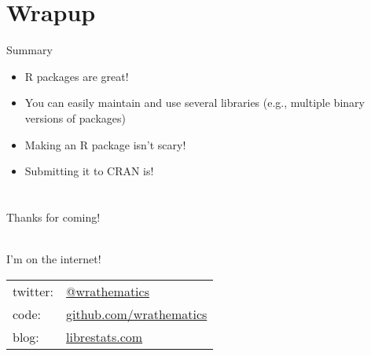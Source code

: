 \section{Wrapup}
\makesubcontentsslides
\hidenum

\begin{frame}
  \begin{block}{Summary}
    \begin{itemize}
      \item R packages are great!
      \item You can easily maintain and use several libraries (e.g., multiple 
binary versions of packages)
      \item Making an R package isn't scary!
      \item Submitting it to CRAN is!
    \end{itemize}
  \end{block}
\end{frame}



\section*{}



\begin{frame}[noframenumbering]
 \begin{block}{Thanks for coming!}
 \begin{center}
 \vspace{.4cm}{\Huge Questions?}
  \\\vspace{1.2cm}
  I'm on the internet!\\[.2cm]
  \begin{tabular}{ll}
    twitter: & \href{http://twitter.com/wrathematics}{@wrathematics} \\
    code: & \url{github.com/wrathematics} \\
    blog: & \url{librestats.com}
  \end{tabular}
  \end{center}
 \end{block}
\end{frame}
